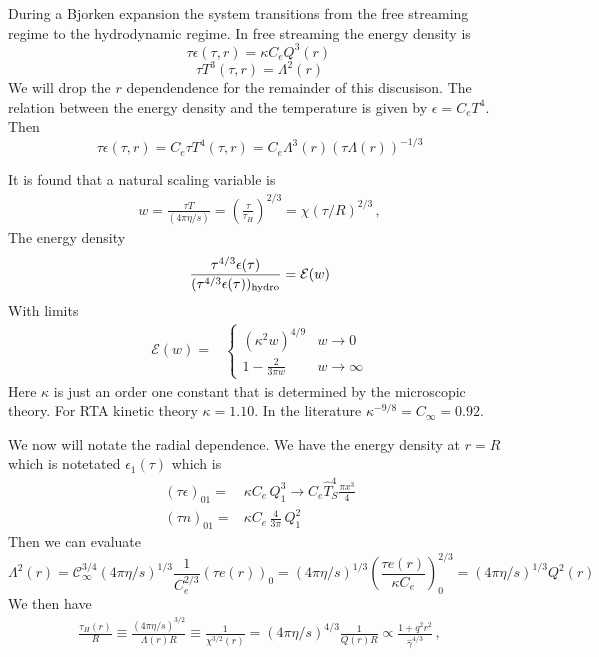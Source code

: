 \documentclass[12pt,aps,preprint,nofootinbib,noshowkeys,noshowpacs,longbibliography,superscriptaddress,tightenlines]{revtex4-2}
\def\Kinf{\kappa}
\begin{document}
During a Bjorken expansion the system transitions from the free streaming regime to the hydrodynamic regime.  In free streaming the energy density is 
\begin{equation}
  \tau \epsilon(\tau, r) = \Kinf C_eQ^3(r) \, 
\end{equation}
\begin{equation}
  \tau T^3(\tau,r)  = \Lambda^2(r)
\end{equation}
We will drop the $r$ dependendence  for the remainder of this discusison. 
The relation between the energy density and the temperature is given by $\epsilon = C_e T^4$.  Then 
\begin{equation}
  \tau \epsilon(\tau, r) = C_e \tau T^4(\tau, r) = C_e \Lambda^3(r) (\tau \Lambda(r))^{-1/3}
\end{equation}

It is found that a natural scaling variable is 
\begin{align}
   w = \frac{\tau T}{(4\pi \eta/s)}  =  \left(\frac{\tau}{\tau_H}\right)^{2/3} = \chi (\tau/R)^{2/3} \, ,
\end{align}
The energy density 
\begin{align}
  \frac{\tau^{4/3} \epsilon(\tau) }{(\tau^{4/3} \epsilon(\tau))_{\rm hydro}} =   \mathcal E(w)
\end{align}
With limits 
\begin{align}
  \mathcal E(w) =& \begin{cases}
      (\Kinf^2 w)^{4/9} & w \rightarrow 0 \\
   1 - \frac{2}{3 \pi w} & w \rightarrow \infty 
  \end{cases}
\end{align}
Here $\Kinf$ is just an order one constant that is determined by the microscopic theory.  For RTA kinetic theory $\Kinf = 1.10$. 
In the literature $\Kinf^{-9/8} = C_{\infty} = 0.92$. 


  
We now will notate the radial dependence. We have the energy density at $r=R$ 
which is notetated $\epsilon_1(\tau)$ which is 
   \begin{align}
   (\tau \epsilon)_{01}  =& \Kinf C_e \, Q_1^3  \rightarrow  C_e \hat{T}^4_S \frac{\pi x^3}{4} \\
   (\tau n)_{01}  =& \Kinf C_e\,  \frac{4}{3\pi}\, Q_1^2 
   \end{align}
  Then we can evaluate 
  \begin{equation}
    \Lambda^2(r) =  {\mathcal C}_{\infty}^{3/4} (4\pi \eta/s)^{1/3} \frac{1}{C_e^{2/3}}  (\tau e(r))_0  =  (4\pi \eta/s)^{1/3} \left( \frac{\tau e(r)}{\Kinf C_e} \right)_0^{2/3} =  (4\pi \eta/s)^{1/3} Q^2(r)
  \end{equation} 
We then have 
\begin{align}
   \frac{\tau_H(r)}{R} \equiv   \frac{(4\pi \eta/s)^{3/2}}{\Lambda(r) R} \equiv \frac{1}{\chi^{3/2}(r)} = (4\pi \eta/s)^{4/3} \frac{1}{Q(r) R}   \propto  \frac{1 + q^2 r^2}{\hat{\gamma}^{4/3}} \, ,
\end{align}
\end{document}
